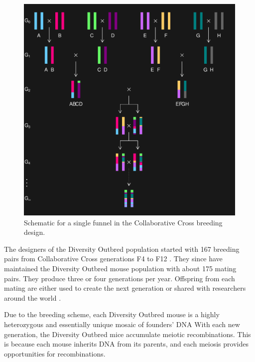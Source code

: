 \documentclass[oneside]{book}\usepackage[]{graphicx}\usepackage[]{color}
\makeatletter
\def\maxwidth{ %
  \ifdim\Gin@nat@width>\linewidth
    \linewidth
  \else
    \Gin@nat@width
  \fi
}
\newenvironment{knitrout}{}{} %
\def\maxwidth{\ifdim\Gin@nat@width>\linewidth\linewidth\else\Gin@nat@width\fi}
\makeatother
\begin{document}
\begin{knitrout}
\color{fgcolor}\begin{figure}
\includegraphics[width=\maxwidth]{figure/ri8-1} \caption[Schematic for a single funnel in the Collaborative Cross breeding design]{Schematic for a single funnel in the Collaborative Cross breeding design.}\label{fig:ri8}
\end{figure}


\end{knitrout}




The designers of the Diversity Outbred population started with 167 breeding pairs
from Collaborative Cross generations F4 to F12 \citep{svenson2012high}. They since
have maintained the Diversity Outbred mouse population with about 175 mating pairs.
They produce three or four generations per year. Offspring from each mating are either
used to create the next generation or shared with researchers around the 
world \citep{svenson2012high,chesler2016diversity}. 

Due to the breeding scheme, each Diversity Outbred mouse is a highly 
heterozygous and essentially unique mosaic of 
founders' DNA 
With each new generation, the Diversity Outbred mice accumulate meiotic recombinations. 
This is because each mouse inherits DNA from its parents, and each meiosis provides
opportunities for recombinations. 
\end{document}
